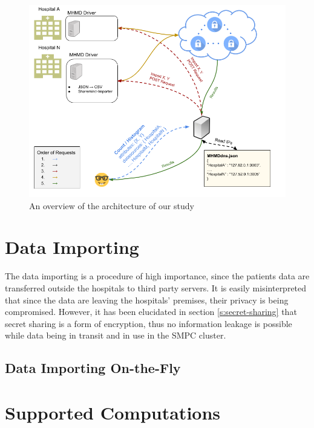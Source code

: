 \begin{figure}[th]
  \centering
  \includegraphics[width=\linewidth]{figures/overview.png}
  \caption{An overview of the architecture of our study }\label{f:overview}
\end{figure}



\section{Data Importing}\label{s:importing}
The data importing is a procedure of high importance, since the patients data are transferred outside the hospitals to third party servers.
It is easily misinterpreted that since the data are leaving the hospitals' premises, their privacy is being compromised.
However, it has been elucidated in section \ref{s:secret-sharing} that secret sharing is a form of encryption, thus no information leakage is possible while data being in transit and in use in the SMPC cluster.



\subsection{Data Importing On-the-Fly}\label{s:importing-otf}




\section{Supported Computations}\label{s:computations}





